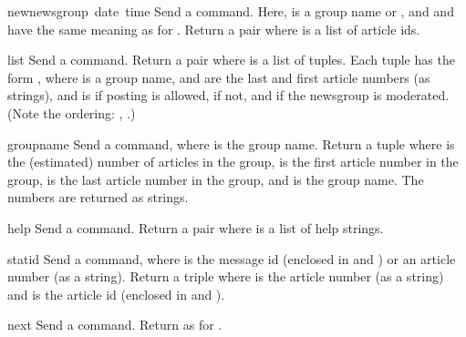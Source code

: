 \begin{funcdesc}{newnews}{group\, date\, time}
Send a  command.  Here,  is a group name or
, and  and  have the same meaning as for
.  Return a pair  where  is a list of article ids.
\end{funcdesc}

\begin{funcdesc}{list}{}
Send a  command.  Return a pair  where  is a list of tuples.  Each tuple has the
form , where
 is a group name,  and  are the last
and first article numbers (as strings), and  is 
if posting is allowed,  if not, and  if the
newsgroup is moderated.  (Note the ordering: , .)
\end{funcdesc}

\begin{funcdesc}{group}{name}
Send a  command, where  is the group name.
Return a tuple  where  is the (estimated) number
of articles in the group,  is the first article number in
the group,  is the last article number in the group, and
 is the group name.  The numbers are returned as strings.
\end{funcdesc}

\begin{funcdesc}{help}{}
Send a  command.  Return a pair  where  is a list of help strings.
\end{funcdesc}

\begin{funcdesc}{stat}{id}
Send a  command, where  is the message id (enclosed
in \samp{<} and \samp{>}) or an article number (as a string).
Return a triple  where
 is the article number (as a string) and  is the
article id  (enclosed in \samp{<} and \samp{>}).
\end{funcdesc}

\begin{funcdesc}{next}{}
Send a  command.  Return as for .
\end{funcdesc}

